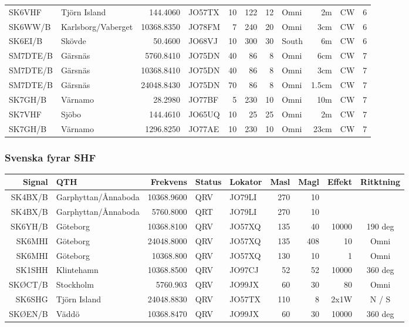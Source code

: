 \begin{longtable}{llrlrrrlrll}
	SK6VHF   & Tjörn Island        &   144.4060 & JO57TX &   10 &  122 &   12 & Omni    &    2m & CW     & 6    \\
	SK6WW/B  & Karlsborg/Vaberget  & 10368.8350 & JO78FM &    7 &  240 &   20 & Omni    &   3cm & CW     & 6    \\
	SK6EI/B  & Skövde              &    50.4600 & JO68VJ &   10 &  300 &   30 & South   &    6m & CW     & 6    \\
	SM7DTE/B & Gärsnäs             &  5760.8410 & JO75DN &   40 &   86 &    8 & Omni    &   6cm & CW     & 7    \\
	SM7DTE/B & Gärsnäs             & 10368.8410 & JO75DN &   40 &   86 &    8 & Omni    &   3cm & CW     & 7    \\
	SM7DTE/B & Gärsnäs             & 24048.8430 & JO75DN &   70 &   86 &    8 & Omni    & 1.5cm & CW     & 7    \\
	SK7GH/B  & Värnamo             &    28.2980 & JO77BF &    5 &  230 &   10 & Omni    &   10m & CW     & 7    \\
	SK7VHF   & Sjöbo               &   144.4610 & JO65UQ &   10 &   25 &   25 & Omni    &    2m & CW     & 7    \\
	SK7GH/B  & Värnamo             &  1296.8250 & JO77AE &   10 &  230 &   10 & Omni    &  23cm & CW     & 7
\end{longtable}



\subsubsection{Svenska fyrar SHF}
\begin{longtable}{rlrllrrrc}

\textbf{Signal} & \textbf{QTH}  & \textbf{Frekvens} & \textbf{Status} & \textbf{Lokator} & 
\textbf{Masl}   & \textbf{Magl} & \textbf{Effekt}   & \textbf{Ritktning} \\ \hline

SK4BX/B & Garphyttan/Ånnaboda & 10368.9600 & QRV & JO79LI & 270 & 10  &       &         \\
SK4BX/B & Garphyttan/Ånnaboda & 5760.8000  & QRT & JO79LI & 270 & 10  &       &         \\
SK6YH/B & Göteborg            & 10368.8100 & QRV & JO57XQ & 135 & 40  & 10000 & 190 deg \\
SK6MHI  & Göteborg            & 24048.8000 & QRV & JO57XQ & 135 & 408 & 10    & Omni    \\
SK6MHI  & Göteborg            & 10368.800  & QRV & JO57XQ & 130 & 10  & 1     & Omni    \\
SK1SHH  & Klintehamn          & 10368.8500 & QRV & JO97CJ & 52  & 52  & 10000 & 360 deg \\
SKØCT/B & Stockholm           & 5760.903   & QRV & JO99JX & 60  & 30  & 80    & Omni    \\
SK6SHG  & Tjörn Island        & 24048.8830 & QRV & JO57TX & 110 & 8   & 2x1W  & N / S   \\
SKØEN/B & Väddö               & 10368.8470 & QRV & JO99JX & 60  & 30  & 10000 & 360 deg \\

\end{longtable}

